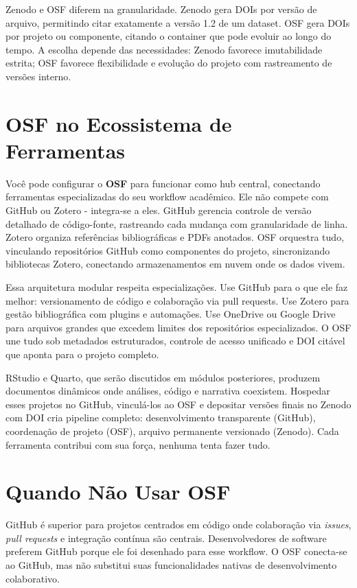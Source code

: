 \documentclass[
  a4paper,
]{book}
\begin{document}
Zenodo e OSF diferem na granularidade. Zenodo gera DOIs por versão de
arquivo, permitindo citar exatamente a versão 1.2 de um dataset. OSF
gera DOIs por projeto ou componente, citando o container que pode
evoluir ao longo do tempo. A escolha depende das necessidades: Zenodo
favorece imutabilidade estrita; OSF favorece flexibilidade e evolução do
projeto com rastreamento de versões interno.

\section{OSF no Ecossistema de
Ferramentas}\label{osf-no-ecossistema-de-ferramentas}

Você pode configurar o \textbf{OSF} para funcionar como hub central,
conectando ferramentas especializadas do seu workflow acadêmico. Ele não
compete com GitHub ou Zotero - integra-se a eles. GitHub gerencia
controle de versão detalhado de código-fonte, rastreando cada mudança
com granularidade de linha. Zotero organiza referências bibliográficas e
PDFs anotados. OSF orquestra tudo, vinculando repositórios GitHub como
componentes do projeto, sincronizando bibliotecas Zotero, conectando
armazenamentos em nuvem onde os dados vivem.

Essa arquitetura modular respeita especializações. Use GitHub para o que
ele faz melhor: versionamento de código e colaboração via pull requests.
Use Zotero para gestão bibliográfica com plugins e automações. Use
OneDrive ou Google Drive para arquivos grandes que excedem limites dos
repositórios especializados. O OSF une tudo sob metadados estruturados,
controle de acesso unificado e DOI citável que aponta para o projeto
completo.

RStudio e Quarto, que serão discutidos em módulos posteriores, produzem
documentos dinâmicos onde análises, código e narrativa coexistem.
Hospedar esses projetos no GitHub, vinculá-los ao OSF e depositar
versões finais no Zenodo com DOI cria pipeline completo: desenvolvimento
transparente (GitHub), coordenação de projeto (OSF), arquivo permanente
versionado (Zenodo). Cada ferramenta contribui com sua força, nenhuma
tenta fazer tudo.

\section{Quando Não Usar OSF}\label{quando-nuxe3o-usar-osf}

GitHub é superior para projetos centrados em código onde colaboração via
\emph{issues}, \emph{pull requests} e integração contínua são centrais.
Desenvolvedores de software preferem GitHub porque ele foi desenhado
para esse workflow. O OSF conecta-se ao GitHub, mas não substitui suas
funcionalidades nativas de desenvolvimento colaborativo.
\end{document}
